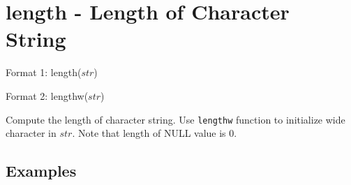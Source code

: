 
%

\section{length - Length of Character String\label{sect:length}}

Format 1: length($str$)

Format 2: lengthw($str$)

Compute the length of character string. 
Use \verb|lengthw| function to initialize wide character in $str$. Note that length of NULL value is 0.


\subsection*{Examples}


%

